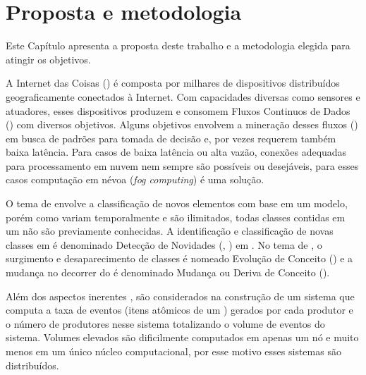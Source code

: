 \chapter{Proposta e metodologia}\label{cha:proposta}

\begin{resumocap}

  Este Capítulo apresenta a proposta deste trabalho e a metodologia elegida para
  atingir os objetivos.

\end{resumocap}

\newcommand{\fog}{\emph{fog computing}\xspace}
\newcommand{\cloud}{\emph{cloud computing}\xspace}

\newcommand{\mfog}{M-FOG\xspace}
\newcommand{\flink}{\emph{Apache Flink}\xspace}

A Internet das Coisas (\iot) é composta por milhares de dispositivos distribuídos
geograficamente conectados à Internet.
Com capacidades diversas como sensores e atuadores, esses dispositivos produzem e
consomem Fluxos Continuos de Dados (\streams) com diversos objetivos.
Alguns objetivos envolvem a mineração desses fluxos (\streamMining) em busca de
padrões para tomada de decisão e, por vezes requerem também baixa latência.
Para casos de baixa latência ou alta vazão, conexões adequadas para
processamento em nuvem nem sempre são possíveis ou desejáveis, para esses casos
computação em névoa (\fog) é uma solução.

O tema de \streamMining envolve a classificação de novos elementos com base em
um modelo, porém como \streams variam temporalmente e são ilimitados, todas
classes contidas em um \stream não são previamente conhecidas.
A identificação e classificação de novas classes em \streams é denominado
Detecção de Novidades (\novelty, \nd) em \streams.
No tema de \nd, o surgimento e desaparecimento de classes é nomeado Evolução de Conceito
(\evolution) e a mudança no decorrer do \stream é denominado Mudança ou Deriva
de Conceito (\drift).

Além dos aspectos inerentes \streamMining, são considerados na construção de um
sistema que computa \streams a taxa de eventos (itens atômicos de um \stream)
gerados por cada produtor e o número de produtores nesse sistema totalizando o
volume de eventos do sistema.
Volumes elevados são dificilmente computados em apenas um nó e muito menos em um
único núcleo computacional, por esse motivo esses sistemas são distribuídos.

